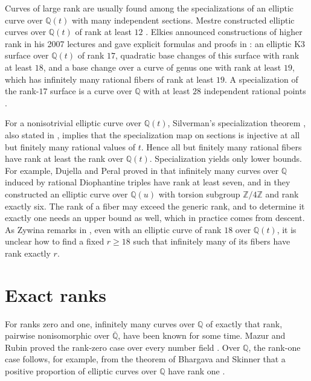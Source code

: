 \documentclass[12pt,oneside,openany]{book}
\theoremstyle{definition}
\theoremstyle{plain}
\numberwithin{equation}{chapter}
\theoremstyle{plain}
\theoremstyle{definition}
\theoremstyle{remark}
\newcommand{\Q}{\mathbb Q}
\newcommand{\Z}{\mathbb Z}
\newcommand{\Qbar}{\overline{\mathbb Q}}
\begin{document}
Curves of large rank are usually found among the specializations of an elliptic curve over $\Q(t)$ with many independent sections. Mestre constructed elliptic curves over $\Q(t)$ of rank at least $12$ \cite{Mestre1991}. Elkies announced constructions of higher rank in his 2007 lectures \cite{Elkies2007} and gave explicit formulas and proofs in \cite[Theorems~1--3]{Elkies2026}: an elliptic K3 surface over $\Q(t)$ of rank $17$, quadratic base changes of this surface with rank at least $18$, and a base change over a curve of genus one with rank at least $19$, which has infinitely many rational fibers of rank at least $19$. A specialization of the rank-$17$ surface is a curve over $\Q$ with at least $28$ independent rational points \cite[Theorem~2]{Elkies2026}.

For a nonisotrivial elliptic curve over $\Q(t)$, Silverman's specialization theorem \cite[Theorem~C, p.~208]{Silverman1983}, also stated in \cite[Theorem~C.20.3]{SilvermanAEC}, implies that the specialization map on sections is injective at all but finitely many rational values of $t$. Hence all but finitely many rational fibers have rank at least the rank over $\Q(t)$. Specialization yields only lower bounds. For example, Dujella and Peral proved in \cite[\S3]{DujellaPeral2020} that infinitely many curves over $\Q$ induced by rational Diophantine triples have rank at least seven, and in \cite[\S4]{DujellaPeral2024} they constructed an elliptic curve over $\Q(u)$ with torsion subgroup $\Z/4\Z$ and rank exactly six. The rank of a fiber may exceed the generic rank, and to determine it exactly one needs an upper bound as well, which in practice comes from descent. As Zywina remarks in \cite[\S1]{Zywina2026}, even with an elliptic curve of rank $18$ over $\Q(t)$, it is unclear how to find a fixed $r\ge 18$ such that infinitely many of its fibers have rank exactly $r$.

\section{Exact ranks}\label{sec:intro-exact}

For ranks zero and one, infinitely many curves over $\Q$ of exactly that rank, pairwise nonisomorphic over $\Qbar$, have been known for some time. Mazur and Rubin proved the rank-zero case over every number field \cite[Corollary~1.11 and proof of Lemma~5.4]{MazurRubin2010}. Over $\Q$, the rank-one case follows, for example, from the theorem of Bhargava and Skinner that a positive proportion of elliptic curves over $\Q$ have rank one \cite{BhargavaSkinner2014}.
\end{document}
